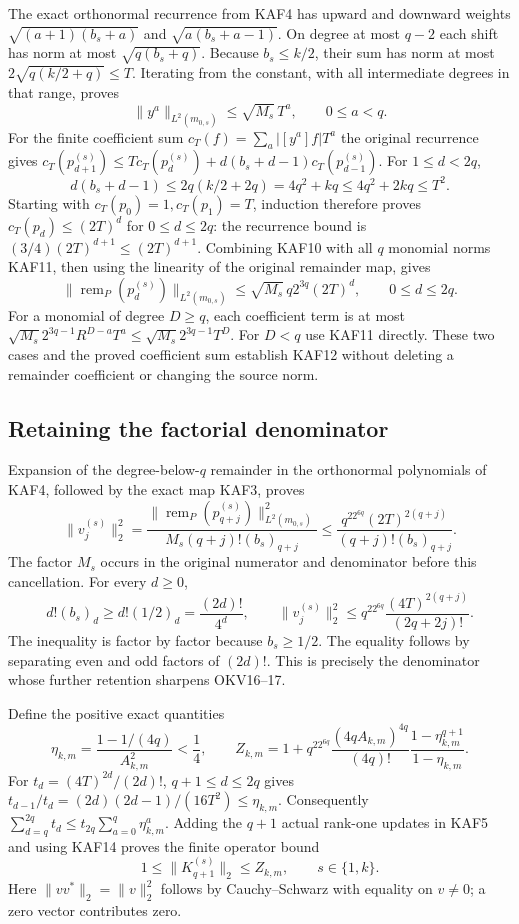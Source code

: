 \documentclass[11pt,a4paper]{article}
\begin{document}
The exact orthonormal recurrence from KAF4 has upward and downward
weights $\sqrt{(a+1)(b_s+a)}$ and $\sqrt{a(b_s+a-1)}$.
On degree at most $q-2$ each shift has norm at most
$\sqrt{q(b_s+q)}$. Because $b_s\le k/2$, their sum has norm at
most $2\sqrt{q(k/2+q)}\le T$. Iterating from the constant, with all
intermediate degrees in that range, proves
\[
 \|y^a\|_{L^2(m_{0,s})}\le\sqrt{M_s}\,T^a,
 \qquad0\le a<q.\tag{KAF11}
\]
For the finite coefficient sum $c_T(f)=\sum_a|[y^a]f|T^a$ the
original recurrence gives
$c_T(p_{d+1}^{(s)})\le T c_T(p_d^{(s)})+
d(b_s+d-1)c_T(p_{d-1}^{(s)})$.
For $1\le d<2q$,
\[
 d(b_s+d-1)\le2q(k/2+2q)=4q^2+kq
       \le4q^2+2kq\le T^2.
\]
Starting with $c_T(p_0)=1,c_T(p_1)=T$, induction therefore proves
$c_T(p_d)\le(2T)^d$ for $0\le d\le2q$: the recurrence bound is
$(3/4)(2T)^{d+1}\le(2T)^{d+1}$.
Combining KAF10 with all $q$ monomial norms KAF11, then using the
linearity of the original remainder map, gives
\[
 \|\operatorname{rem}_P(p_d^{(s)})\|_{L^2(m_{0,s})}
       \le\sqrt{M_s}\,q2^{3q}(2T)^d,
       \qquad0\le d\le2q.\tag{KAF12}
\]
For a monomial of degree $D\ge q$, each coefficient term is at
most $\sqrt{M_s}2^{3q-1}R^{D-a}T^a\le
\sqrt{M_s}2^{3q-1}T^D$. For $D<q$ use KAF11 directly.
These two cases and the proved coefficient sum establish KAF12
without deleting a remainder coefficient or changing the source norm.

\subsection{Retaining the factorial denominator}
Expansion of the degree-below-$q$ remainder in the orthonormal
polynomials of KAF4, followed by the exact map KAF3, proves
\[
 \|v_j^{(s)}\|_2^2
 =\frac{\|\operatorname{rem}_P(p_{q+j}^{(s)})\|_{L^2(m_{0,s})}^2}
          {M_s(q+j)!(b_s)_{q+j}}
 \le\frac{q^22^{6q}(2T)^{2(q+j)}}{(q+j)!(b_s)_{q+j}}.
 \tag{KAF13}
\]
The factor $M_s$ occurs in the original numerator and denominator
before this cancellation. For every $d\ge0$,
\[
 d!(b_s)_d\ge d!(1/2)_d=\frac{(2d)!}{4^d},
 \qquad
 \|v_j^{(s)}\|_2^2\le q^22^{6q}\frac{(4T)^{2(q+j)}}{(2q+2j)!}.
 \tag{KAF14}
\]
The inequality is factor by factor because $b_s\ge1/2$.
The equality follows by separating even and odd factors of $(2d)!$.
This is precisely the denominator whose further retention sharpens
OKV16--17.

Define the positive exact quantities
\[
 \eta_{k,m}=\frac{1-1/(4q)}{A_{k,m}^2}<\frac14,\qquad
 Z_{k,m}=1+q^22^{6q}\frac{(4qA_{k,m})^{4q}}{(4q)!}
              \frac{1-\eta_{k,m}^{q+1}}{1-\eta_{k,m}}.
 \tag{KAF15}
\]
For $t_d=(4T)^{2d}/(2d)!$, $q+1\le d\le2q$ gives
$t_{d-1}/t_d=(2d)(2d-1)/(16T^2)\le\eta_{k,m}$.
Consequently $\sum_{d=q}^{2q}t_d\le
t_{2q}\sum_{a=0}^q\eta_{k,m}^a$. Adding the $q+1$ actual rank-one
updates in KAF5 and using KAF14 proves the finite operator bound
\[
 \boxed{1\le\|K_{q+1}^{(s)}\|_2\le Z_{k,m},\qquad s\in\{1,k\}.}
 \tag{KAF16}
\]
Here $\|vv^*\|_2=\|v\|_2^2$ follows by Cauchy--Schwarz with
equality on $v\ne0$; a zero vector contributes zero.
\end{document}
